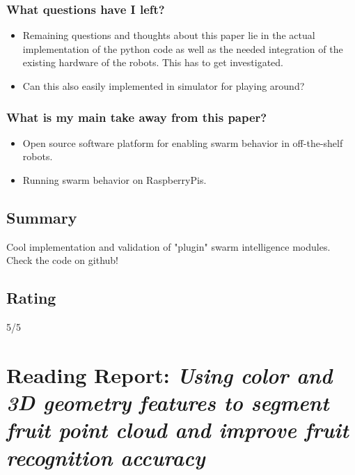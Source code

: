 \subsubsection*{What questions have I left?}
\begin{itemize}
    \item Remaining questions and thoughts about this paper lie in the actual implementation of the python code as well as the needed integration of the existing hardware of the robots. This has to get investigated.
    \item Can this also easily implemented in simulator for playing around?
\end{itemize}
\subsubsection*{What is my main take away from this paper?}
\begin{itemize}
    \item Open source software platform for enabling swarm behavior in off-the-shelf robots.
    \item Running swarm behavior on RaspberryPis.
\end{itemize}

\subsection*{Summary}
Cool implementation and validation of "plugin" swarm intelligence modules. Check the code on github!
\subsection*{Rating}
5/5


\section{Reading Report: \emph{Using color and 3D geometry features to segment fruit point cloud and improve fruit recognition accuracy}}
\cite{Wu2020}

